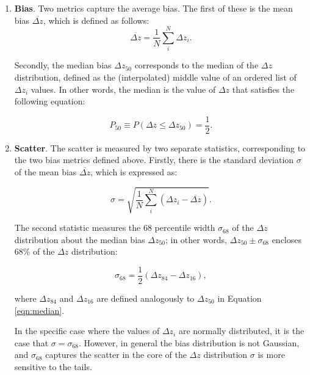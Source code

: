 \begin{enumerate}[label=(\roman*)]
\item \textbf{Bias}. Two metrics capture the average bias. The first of these is the mean bias $\overbar{\Delta z}$, which is defined as follows:
\begin{equation}
\overbar{\Delta z} = \frac{1}{N} \sum^{N}_{i} \Delta z_{i}. \label{eqn:bias}
\end{equation}
  
Secondly, the median bias $\Delta z_{50}$ corresponds to the median of the $\Delta z$ distribution, defined as the (interpolated) middle value of an ordered list of $\Delta z_{i}$ values. In other words, the median is the value of $\Delta z$ that satisfies the following equation:

\begin{equation}
 P_{50} \equiv P(\Delta z \leq \Delta z_{50}) = \frac{1}{2}. \label{eqn:median}
\end{equation}
 
\item \textbf{Scatter}. The scatter is measured by two separate statistics, corresponding to the two bias metrics defined above. Firstly, there is the standard deviation $\sigma$ of the mean bias $\overbar{\Delta z}$, which is expressed as: 

 \begin{equation}
 \sigma = \sqrt{\frac{1}{N} \sum^{N}_{i} (\Delta z_{i} - \overbar{\Delta z})}.
 \end{equation}

The second statistic measures the 68 percentile width $\sigma_{68}$ of the $\Delta z$ distribution about the median bias $\Delta z_{50}$; in other words, $\Delta z_{50} \pm \sigma_{68}$ encloses 68\% of the $\Delta z$ distribution:

\begin{equation}
\sigma_{68} = \frac{1}{2} (\Delta z_{84} - \Delta z_{16}),
\end{equation}
 
\noindent where $\Delta z_{84}$ and $\Delta z_{16}$ are defined analogously to $\Delta z_{50}$ in Equation \ref{eqn:median}. \par


In the specific case where the values of $\Delta z_i$ are normally distributed, it is the case that $\sigma = \sigma_{68}$. However, in general the bias distribution is not Gaussian, and $\sigma_{68}$ captures the scatter in the core of the $\Delta z$ distribution  $\sigma$ is more sensitive to the tails.\par  


\end{enumerate}
